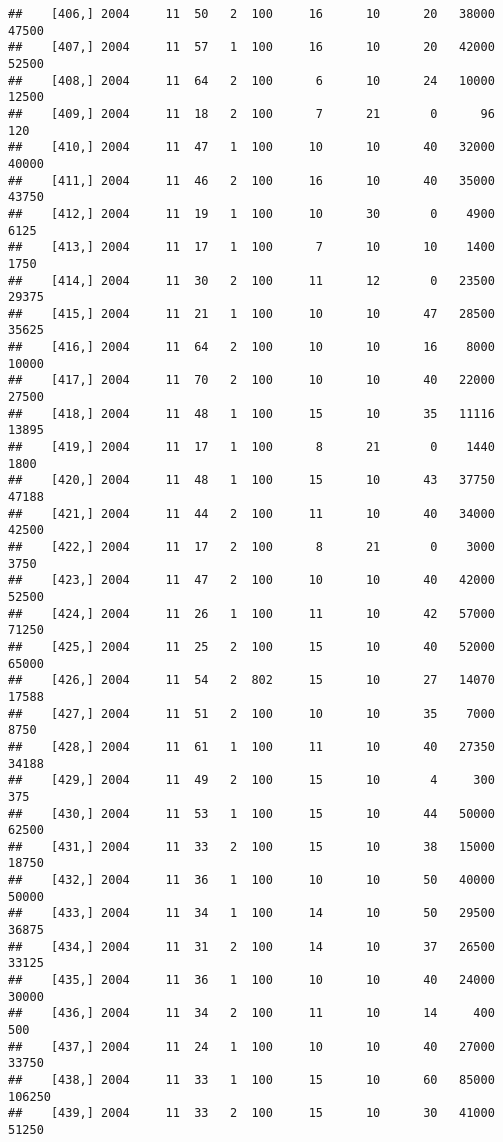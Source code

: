\documentclass{article}\usepackage[]{graphicx}\usepackage[]{color}
\makeatletter
\newenvironment{kframe}{%
 \def\at@end@of@kframe{}%
 \ifinner\ifhmode%
  \def\at@end@of@kframe{\end{minipage}}%
  \begin{minipage}{\columnwidth}%
 \fi\fi%
 \def\FrameCommand##1{\hskip\@totalleftmargin \hskip-\fboxsep
 \colorbox{shadecolor}{##1}\hskip-\fboxsep
     \hskip-\linewidth \hskip-\@totalleftmargin \hskip\columnwidth}%
 \MakeFramed {\advance\hsize-\width
   \@totalleftmargin\z@ \linewidth\hsize
   \@setminipage}}%
 {\par\unskip\endMakeFramed%
 \at@end@of@kframe}
\newenvironment{knitrout}{}{} %
\makeatother
\begin{document}
\begin{knitrout}
\begin{kframe}
\begin{verbatim}
##    [406,] 2004     11  50   2  100     16      10      20   38000   47500
##    [407,] 2004     11  57   1  100     16      10      20   42000   52500
##    [408,] 2004     11  64   2  100      6      10      24   10000   12500
##    [409,] 2004     11  18   2  100      7      21       0      96     120
##    [410,] 2004     11  47   1  100     10      10      40   32000   40000
##    [411,] 2004     11  46   2  100     16      10      40   35000   43750
##    [412,] 2004     11  19   1  100     10      30       0    4900    6125
##    [413,] 2004     11  17   1  100      7      10      10    1400    1750
##    [414,] 2004     11  30   2  100     11      12       0   23500   29375
##    [415,] 2004     11  21   1  100     10      10      47   28500   35625
##    [416,] 2004     11  64   2  100     10      10      16    8000   10000
##    [417,] 2004     11  70   2  100     10      10      40   22000   27500
##    [418,] 2004     11  48   1  100     15      10      35   11116   13895
##    [419,] 2004     11  17   1  100      8      21       0    1440    1800
##    [420,] 2004     11  48   1  100     15      10      43   37750   47188
##    [421,] 2004     11  44   2  100     11      10      40   34000   42500
##    [422,] 2004     11  17   2  100      8      21       0    3000    3750
##    [423,] 2004     11  47   2  100     10      10      40   42000   52500
##    [424,] 2004     11  26   1  100     11      10      42   57000   71250
##    [425,] 2004     11  25   2  100     15      10      40   52000   65000
##    [426,] 2004     11  54   2  802     15      10      27   14070   17588
##    [427,] 2004     11  51   2  100     10      10      35    7000    8750
##    [428,] 2004     11  61   1  100     11      10      40   27350   34188
##    [429,] 2004     11  49   2  100     15      10       4     300     375
##    [430,] 2004     11  53   1  100     15      10      44   50000   62500
##    [431,] 2004     11  33   2  100     15      10      38   15000   18750
##    [432,] 2004     11  36   1  100     10      10      50   40000   50000
##    [433,] 2004     11  34   1  100     14      10      50   29500   36875
##    [434,] 2004     11  31   2  100     14      10      37   26500   33125
##    [435,] 2004     11  36   1  100     10      10      40   24000   30000
##    [436,] 2004     11  34   2  100     11      10      14     400     500
##    [437,] 2004     11  24   1  100     10      10      40   27000   33750
##    [438,] 2004     11  33   1  100     15      10      60   85000  106250
##    [439,] 2004     11  33   2  100     15      10      30   41000   51250

\end{verbatim}
\end{kframe}
\end{knitrout}
\end{document}
